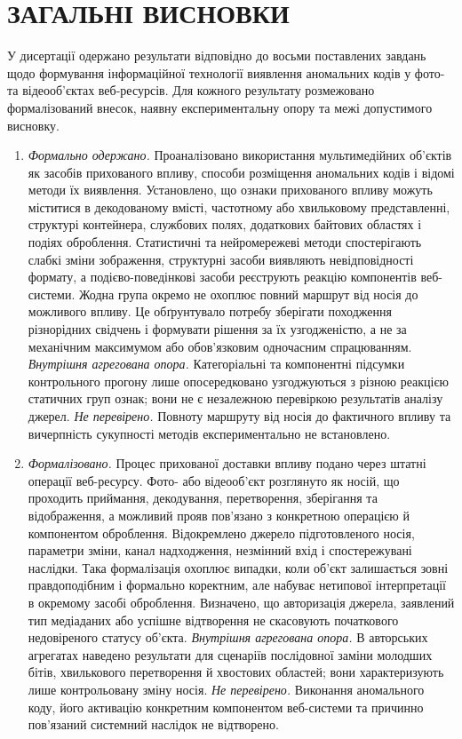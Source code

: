 \chapter*{ЗАГАЛЬНІ ВИСНОВКИ}

У дисертації одержано результати відповідно до восьми поставлених завдань щодо формування інформаційної технології виявлення аномальних кодів у фото- та відеооб’єктах веб-ресурсів. Для кожного результату розмежовано формалізований внесок, наявну експериментальну опору та межі допустимого висновку.

\begin{enumerate}[label=\arabic*.]
\item \textit{Формально одержано.} Проаналізовано використання мультимедійних об’єктів як засобів прихованого впливу, способи розміщення аномальних кодів і відомі методи їх виявлення. Установлено, що ознаки прихованого впливу можуть міститися в декодованому вмісті, частотному або хвильковому представленні, структурі контейнера, службових полях, додаткових байтових областях і подіях оброблення. Статистичні та нейромережеві методи спостерігають слабкі зміни зображення, структурні засоби виявляють невідповідності формату, а подієво-поведінкові засоби реєструють реакцію компонентів веб-системи. Жодна група окремо не охоплює повний маршрут від носія до можливого впливу. Це обґрунтувало потребу зберігати походження різнорідних свідчень і формувати рішення за їх узгодженістю, а не за механічним максимумом або обов’язковим одночасним спрацюванням. \textit{Внутрішня агрегована опора.} Категоріальні та компонентні підсумки контрольного прогону лише опосередковано узгоджуються з різною реакцією статичних груп ознак; вони не є незалежною перевіркою результатів аналізу джерел. \textit{Не перевірено.} Повноту маршруту від носія до фактичного впливу та вичерпність сукупності методів експериментально не встановлено.

\item \textit{Формалізовано.} Процес прихованої доставки впливу подано через штатні операції веб-ресурсу. Фото- або відеооб’єкт розглянуто як носій, що проходить приймання, декодування, перетворення, зберігання та відображення, а можливий прояв пов’язано з конкретною операцією й компонентом оброблення. Відокремлено джерело підготовленого носія, параметри зміни, канал надходження, незмінний вхід і спостережувані наслідки. Така формалізація охоплює випадки, коли об’єкт залишається зовні правдоподібним і формально коректним, але набуває нетипової інтерпретації в окремому засобі оброблення. Визначено, що авторизація джерела, заявлений тип медіаданих або успішне відтворення не скасовують початкового недовіреного статусу об’єкта. \textit{Внутрішня агрегована опора.} В авторських агрегатах наведено результати для сценаріїв послідовної заміни молодших бітів, хвилькового перетворення й хвостових областей; вони характеризують лише контрольовану зміну носія. \textit{Не перевірено.} Виконання аномального коду, його активацію конкретним компонентом веб-системи та причинно пов’язаний системний наслідок не відтворено.


\end{enumerate}

